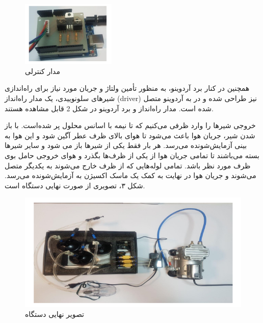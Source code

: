 \documentclass[oneside]{report}
\begin{document}
\begin{figure}[h]
	\centering
	\includegraphics[width=0.4\textwidth]{arduino.png}
	\caption{مدار کنترلی}
	\label{fig:sche2}
\end{figure}


همچنین در کنار برد آردوینو، به منظور تأمین ولتاژ و جریان مورد نیاز برای راه‌اندازی شیرهای سلونوییدی، یک مدار راه‌انداز (driver) نیز طراحی شده و در به آردوینو متصل شده است. مدار راه‌انداز و برد آردوینو در شکل
2 %
 قابل مشاهده هستند.


خروجی شیرها را وارد ظرفی می‌کنیم که تا نیمه با اسانس محلول پر شده‌است. با باز شدن شیر، جریان هوا باعث می‌شود تا هوای بالای ظرف عطر آگین شود و این هوا به بینی آزمایش‌شونده می‌رسد.
هر بار فقط یکی از شیرها باز می شود و سایر شیرها بسته می‌باشند تا تمامی جریان هوا از یکی از ظرف‌ها بگذرد و هوای خروجی حامل بوی ظرف مورد نظر باشد. تمامی لوله‌هایی که از ظرف خارج می‌شوند به یکدیگر متصل می‌شوند و جریان هوا در نهایت به کمک یک ماسک اکسیژن به آزمایش‌شونده می‌رسد.
شکل ۳، تصویری از صورت نهایی دستگاه است.
\begin{figure}[h]
	\centering
	\includegraphics[width=1\textwidth]{full.png}
	\caption{تصویر نهایی دستگاه}
	\label{fig:sche3}
\end{figure}
\end{document}
